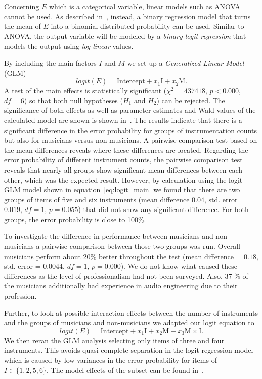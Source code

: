 \par
Concerning $E$ which is a categorical variable, linear models such as ANOVA cannot be used.
As described in~\cite{jaeger08}, instead, a binary regression model that turns the mean of $E$ into a binomial distributed probability can be used.
Similar to ANOVA, the output variable will be modeled by a \emph{binary logit regression} that models the output using \emph{log linear} values.
\par
By including the main factors $I$ and $M$ we set up a \emph{Generalized Linear Model} (GLM)
\begin{equation}
    logit(E) =  \text{Intercept} + x_1 \text{I} + x_2 \text{M} .
    \label{eq:logit_main}
\end{equation}
A test of the main effects is statistically significant ($\chi^2$ = $437418$, $p < 0.000$, $df = 6$) so that both null hypotheses ($H_1$ and $H_2$) can be rejected. The significance of both effects as well as parameter estimates and Wald values of the calculated model are shown is shown in~\cite{stoeter13}.
The results indicate that there is a significant difference in the error probability for groups of instrumentation counts but also for musicians versus non-musicians. A pairwise comparison test based on the mean differences reveals where these differences are located. Regarding the error probability of different instrument counts, the pairwise comparison test reveals that nearly all groups show significant mean differences between each other, which was the expected result. However, by calculation using the logit GLM model shown in equation~\ref{eq:logit_main} we found that there are two groups of items of five and six instruments (mean difference $0.04$, std. error = $0.019$, $df = 1$, $p = 0.055$) that did not show any significant difference. For both groups, the error probability is close to 100\%.
\par
To investigate the difference in performance between musicians and non-musicians a pairwise comparison between those two groups was run. Overall musicians perform about 20\% better throughout the test (mean difference = $0.18$, std. error = $ 0.0044$, $df = 1$, $p=0.000$). We do not know what caused these differences as the level of professionalism had not been surveyed. Also, 37 \% of the musicians additionally had experience in audio engineering due to their profession.
\par
Further, to look at possible interaction effects between the number of instruments and the groups of musicians and non-musicians we adapted our logit equation to
\begin{equation}
    logit(E) =  \text{Intercept} + x_1 \text{I} + x_2 \text{M} + x_3 \text{M}\times\text{I} .
    \label{eq:logit_interactions}
\end{equation}
We then reran the GLM analysis selecting only items of three and four instruments. This avoids quasi-complete separation in the logit regression model which is caused by low variances in the error probability for items of $I \in \{1,2,5,6\}$.
The model effects of the subset can be found in~\cite{stoeter13}.

